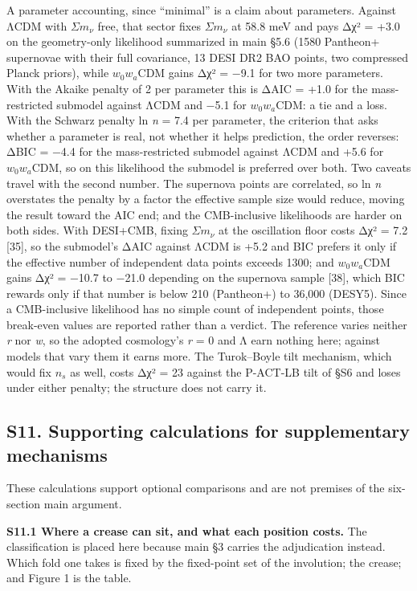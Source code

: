 \documentclass[
]{article}
\begin{document}
A parameter accounting, since ``minimal'' is a claim about parameters.
Against ΛCDM with \(\Sigma m_\nu\) free, that sector fixes
\(\Sigma m_\nu\) at 58.8 meV and pays Δχ² = +3.0 on the geometry-only
likelihood summarized in main §5.6 (1580 Pantheon+ supernovae with their
full covariance, 13 DESI DR2 BAO points, two compressed Planck priors),
while \(w_0w_a\)CDM gains Δχ² = −9.1 for two more parameters. With the
Akaike penalty of 2 per parameter this is ΔAIC = +1.0 for the
mass-restricted submodel against ΛCDM and −5.1 for \(w_0w_a\)CDM: a tie
and a loss. With the Schwarz penalty ln \emph{n} = 7.4 per parameter,
the criterion that asks whether a parameter is real, not whether it
helps prediction, the order reverses: ΔBIC = −4.4 for the
mass-restricted submodel against ΛCDM and +5.6 for \(w_0w_a\)CDM, so on
this likelihood the submodel is preferred over both. Two caveats travel
with the second number. The supernova points are correlated, so ln
\emph{n} overstates the penalty by a factor the effective sample size
would reduce, moving the result toward the AIC end; and the
CMB-inclusive likelihoods are harder on both sides. With DESI+CMB,
fixing \(\Sigma m_\nu\) at the oscillation floor costs Δχ² = 7.2
{[}35{]}, so the submodel's ΔAIC against ΛCDM is +5.2 and BIC prefers it
only if the effective number of independent data points exceeds 1300;
and \(w_0w_a\)CDM gains Δχ² = −10.7 to −21.0 depending on the supernova
sample {[}38{]}, which BIC rewards only if that number is below 210
(Pantheon+) to 36,000 (DESY5). Since a CMB-inclusive likelihood has no
simple count of independent points, those break-even values are reported
rather than a verdict. The reference varies neither \emph{r} nor
\emph{w}, so the adopted cosmology's \emph{r} = 0 and Λ earn nothing
here; against models that vary them it earns more. The Turok--Boyle tilt
mechanism, which would fix \(n_s\) as well, costs Δχ² = 23 against the
P-ACT-LB tilt of §S6 and loses under either penalty; the structure does
not carry it.

\subsection{S11. Supporting calculations for supplementary
mechanisms}\label{s11.-supporting-calculations-for-supplementary-mechanisms}

These calculations support optional comparisons and are not premises of
the six-section main argument.

\textbf{S11.1 Where a crease can sit, and what each position costs.} The
classification is placed here because main §3 carries the adjudication
instead. Which fold one takes is fixed by the fixed-point set of the
involution; the crease; and Figure 1 is the table.
\end{document}
